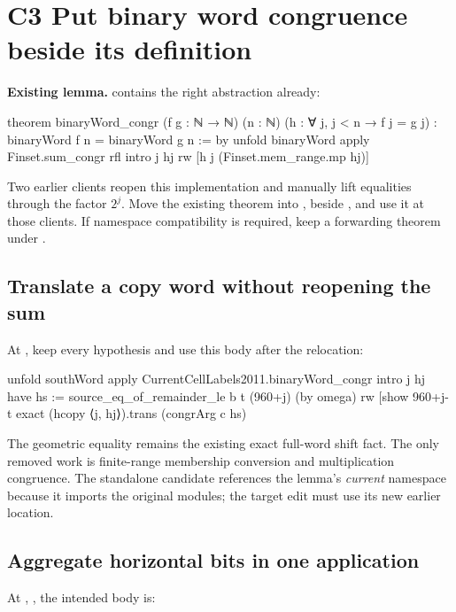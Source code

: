 \section{C3 Put binary word congruence beside its definition}
\label{sec:word}

\textbf{Existing lemma.} 
contains the right abstraction already:

\begin{Lean}
theorem binaryWord_congr (f g : ℕ → ℕ) (n : ℕ)
    (h : ∀ j, j < n → f j = g j) :
    binaryWord f n = binaryWord g n := by
  unfold binaryWord
  apply Finset.sum_congr rfl
  intro j hj
  rw [h j (Finset.mem_range.mp hj)]
\end{Lean}

Two earlier clients reopen this implementation and manually lift equalities
through the factor $2^j$. Move the existing theorem into
, beside , and use it at those
clients. If namespace compatibility is required, keep a forwarding theorem
under .

\subsection{Translate a copy word without reopening the sum}

At , keep every hypothesis and use
this body after the relocation:

\begin{Lean}
  unfold southWord
  apply CurrentCellLabels2011.binaryWord_congr
  intro j hj
  have hs := source_eq_of_remainder_le b t (960+j) (by omega)
  rw [show 960+j-t%
  exact (hcopy ⟨j, hj⟩).trans (congrArg c hs)
\end{Lean}

The geometric equality  remains the existing exact full-word shift
fact. The only removed work is finite-range membership conversion and
multiplication congruence. The standalone candidate references the lemma's
\emph{current} namespace because it imports the original modules; the target
edit must use its new earlier location.

\subsection{Aggregate horizontal bits in one application}

At ,
, the intended body is:

